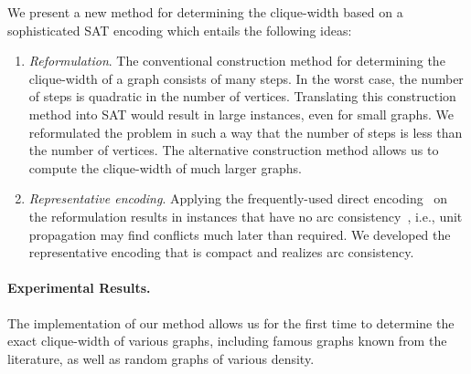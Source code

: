 \documentclass[10pt,usletter]{article}
\theoremstyle{remark}
\begin{document}
We present a new method for determining the
clique-width based on a sophisticated SAT encoding which entails the
following  ideas:
\begin{enumerate}
\item \emph{Reformulation}. The conventional construction method for
  determining the clique-width of a graph consists of many steps. In
  the worst case, the number of steps is quadratic in the number of
  vertices.  Translating this construction method into SAT would
  result in large instances, even for small graphs. We reformulated
  the problem in such a way that the number of steps is less than the
  number of vertices.  The alternative construction method allows us
  to compute the clique-width of much larger graphs.

\item \emph{Representative encoding}. Applying the frequently-used
  direct encoding~\cite{Walsh00} on the reformulation results in
  instances that have no arc consistency~\cite{Gent02}, i.e., unit
  propagation may find conflicts much later than required. We
  developed the representative encoding that is compact and realizes
  arc consistency.

\end{enumerate}
 
\paragraph{Experimental Results.} 


The implementation of our method allows us for the first time to
determine the exact clique-width of various graphs, including famous
graphs known from the literature, as well as random graphs of various
density.
\end{document}
